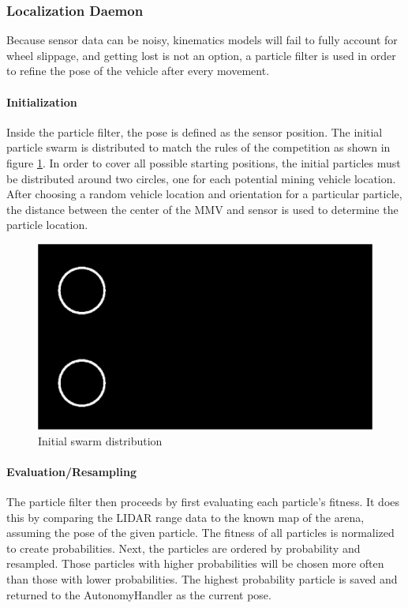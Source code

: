 \subsubsection{Localization Daemon}
Because sensor data can be noisy, kinematics models will fail to fully account for wheel slippage, and getting lost is not an option, a particle filter is used in order to refine the pose of the vehicle after every movement.
\paragraph{Initialization}
Inside the particle filter, the pose is defined as the sensor position.  The initial particle swarm is distributed to match the rules of the competition as shown in figure \ref{fig:swarm-init}.  In order to cover all possible starting positions, the initial particles must be distributed around two circles, one for each potential mining vehicle location.  After choosing a random vehicle location and orientation for a particular particle, the distance between the center of the MMV and sensor is used to determine the particle location.
\begin{figure}[H]
\includegraphics[width=\linewidth]{swarm-init.png}
\caption{Initial swarm distribution}
\label{fig:swarm-init}
\end{figure}
\paragraph{Evaluation/Resampling}
The particle filter then proceeds by first evaluating each particle's fitness.  It does this by comparing the LIDAR range data to the known map of the arena, assuming the pose of the given particle.  The fitness of all particles is normalized to create probabilities.  Next, the particles are ordered by probability and resampled.  Those particles with higher probabilities will be chosen more often than those with lower probabilities.  The highest probability particle is saved and returned to the AutonomyHandler as the current pose.
